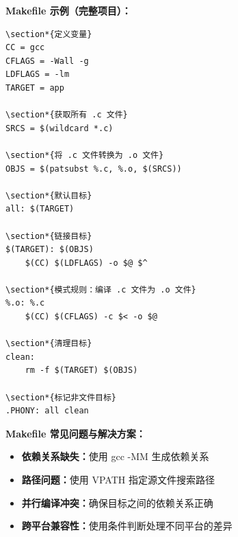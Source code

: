 \documentclass[12pt,UTF8]{ctexbook}
\begin{document}
\textbf{Makefile 示例（完整项目）：}
\begin{verbatim}
\section*{定义变量}
CC = gcc
CFLAGS = -Wall -g
LDFLAGS = -lm
TARGET = app

\section*{获取所有 .c 文件}
SRCS = $(wildcard *.c)

\section*{将 .c 文件转换为 .o 文件}
OBJS = $(patsubst %.c, %.o, $(SRCS))

\section*{默认目标}
all: $(TARGET)

\section*{链接目标}
$(TARGET): $(OBJS)
	$(CC) $(LDFLAGS) -o $@ $^

\section*{模式规则：编译 .c 文件为 .o 文件}
%.o: %.c
	$(CC) $(CFLAGS) -c $< -o $@

\section*{清理目标}
clean:
	rm -f $(TARGET) $(OBJS)

\section*{标记非文件目标}
.PHONY: all clean
\end{verbatim}

\textbf{Makefile 常见问题与解决方案：}
\begin{itemize}
    \item \textbf{依赖关系缺失：}使用 gcc -MM 生成依赖关系
    \item \textbf{路径问题：}使用 VPATH 指定源文件搜索路径
    \item \textbf{并行编译冲突：}确保目标之间的依赖关系正确
    \item \textbf{跨平台兼容性：}使用条件判断处理不同平台的差异
\end{itemize}
\end{document}

